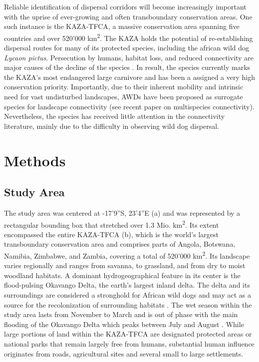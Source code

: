 \documentclass[abstract=on,10pt,a4paper,bibliography=totocnumbered]{article}
\begin{document}
Reliable identification of dispersal corridors will become increasingly
important with the uprise of ever-growing and often transboundary conservation
areas. One such instance is the KAZA-TFCA, a massive conservation area spanning
five countries and over 520'000 km\textsuperscript{2}. The KAZA holds the
potential of re-establishing dispersal routes for many of its protected species,
including the african wild dog \textit{Lycaon pictus}.  Persecution by humans,
habitat loss, and reduced connectivity are major causes of the decline of the
species \citep{Woodroffe.2012}. In result, the species currently marks the
KAZA's most endangered large carnivore and has been a assigned a very high
conservation priority. Importantly, due to their inherent mobility and intrinsic
need for vast undisturbed landscapes, AWDs have been proposed as surrogate
species for landscape connectivity (see recent paper on multispecies
connectivity). Nevertheless, the species has received little attention in the
connectivity literature, mainly due to the difficulty in observing wild dog
dispersal.

\section{Methods}
\subsection{Study Area}
The study area was centered at -17'9''S, 23'4''E
(a) and was represented by a rectangular bounding box that
stretched over 1.3 Mio. km\textsuperscript{2}. Its extent encompassed the entire
KAZA-TFCA (b), which is the world's largest transboundary
conservation area and comprises parts of Angola, Botswana, Namibia, Zimbabwe,
and Zambia, covering a total of 520'000 km\textsuperscript{2}. Its landscape
varies regionally and ranges from savanna, to grassland, and from dry to moist
woodland habitats. A dominant hydrogeographical feature in its center is the
flood-pulsing Okavango Delta, the earth's largest inland delta. The delta and
its surroundings are considered a stronghold for African wild dogs and may act
as a source for the recolonization of surrounding habitats \citep{Cozzi.2013}.
The wet season within the study area lasts from November to March and is out of
phase with the main flooding of the Okavango Delta which peaks between July and
August \citep{McNutt.1996, Wolski.2017}. While large portions of land within the
KAZA-TFCA are designated protected areas or national parks that remain largely
free from humans, substantial human influence originates from roads,
agricultural sites and several small to large settlements.
\end{document}

